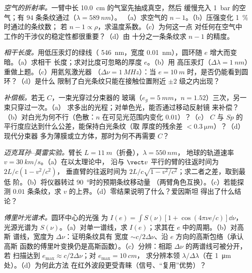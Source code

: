\begin{exercise}[$\star\star$]\label{exo:b2:michelson:6}
\emph{空气的折射率。}一臂中长 \qty{10.0}{cm} 的气室先抽成真空，然后
缓慢充入 \qty{1}{bar} 的空气；有 $94$ 条条纹通过（$\lambda = \qty{589}{nm}$）。
（a）求空气的 $n - 1$。（b）压强变化 \qty{1}{\%} 时通过的条纹数；
若 $n - 1 \propto \rho$，求温度系数。（c）为何这一点
对任何在空气中工作的干涉仪的稳定性都很重要？（d）由
十分之一条条纹求 $n - 1$ 的精度。
\end{exercise}

\begin{exercise}[$\star\star$]\label{exo:b2:michelson:7}
\emph{相干长度。}用低压汞灯的绿线（
\qty{546}{nm}，宽度 \qty{0.01}{nm}），圆环随 $e$ 增大而变暗。（a）求相干
长度；求对比度可忽略的厚度 $e$。（b）用
高压汞灯（$\Delta\lambda = \qty{1}{nm}$）重做上题。（c）用氦氖激光器
（$\Delta\nu = \qty{1}{MHz}$）：当 $e = \qty{10}{m}$ 时，是否仍能看到圆环？（d）是什么
限制了白光条纹只能在接触位置附近 $\pm2$ 级之内出现？
\end{exercise}

\begin{exercise}[$\star\star$]\label{exo:b2:michelson:8}
\emph{补偿板。}若无 $C$，一束光穿过分束器的
玻璃（$e_g = \qty{5}{mm}$，$n = 1.52$）三次，另一束只穿过一次。（a）
求多出的光程；对单色光，能否通过移动反射镜
来补偿？（b）对白光为何不行（色散：$n$
在可见光范围内变化 $0.01$）？（c）
$C$ 与 $Sp$ 的平行度应达到什么公差，能保持白光条纹（取
厚度的残余差 $< \qty{0.3}{\micro m}$）？（d）现代分束器
多为薄膜或立方体，那时为何不再需要 $C$？
\end{exercise}

\begin{exercise}[$\star\star$]\label{exo:b2:michelson:9}
\emph{迈克耳孙–莫雷实验。}臂长 $L = \qty{11}{m}$（折叠），$\lambda = \qty{550}{nm}$，
地球的轨道速率 $v = \qty{30}{km/s}$。（a）在以太理论中，
沿与 $\vect v$ 平行的臂的往返时间为 $2L/c(1 - v^2/c^2)$，
垂直臂的往返时间为 $2L/c\sqrt{1 - v^2/c^2}$；求二者之差，取到最低
阶。（b）将仪器转过 \qty{90}{\degree}时的预期条纹移动量
（两臂角色互换）。（c）若能探测 $0.01$ 条条纹，求
$v$ 的上界。（d）零结果说明了什么？爱因斯坦
得出了什么结论？
\end{exercise}

\begin{exercise}[$\star\star\star$]\label{exo:b2:michelson:10}
\emph{傅里叶光谱术。}圆环中心的光强
为 $I(e) = \int S(\nu)[1 + \cos(4\pi\nu e/c)]\dd\nu$，光源光谱为
$S(\nu)$。（a）对单一谱线，求 $I(e)$；求其在 $e$ 中的周期。（b）对高斯
谱线，宽度为 $\Delta\nu$：证明条纹具有
宽度 $\sim c/2\Delta\nu$、沿 $e$ 方向的高斯包络（承认高斯
函数的傅里叶变换仍是高斯函数）。（c）分辨：相距 $\Delta\nu$ 的两谱线可被分开，若
扫描达到 $e_{\max} \approx c/2\Delta\nu$；对 $e_{\max} = \qty{10}{cm}$，
求分辨本领 $\lambda/\Delta\lambda$（在 \qty{1}{\micro m} 处）。（d）为何此方法
在红外波段更受青睐（信号、“复用”优势）？
\end{exercise}

